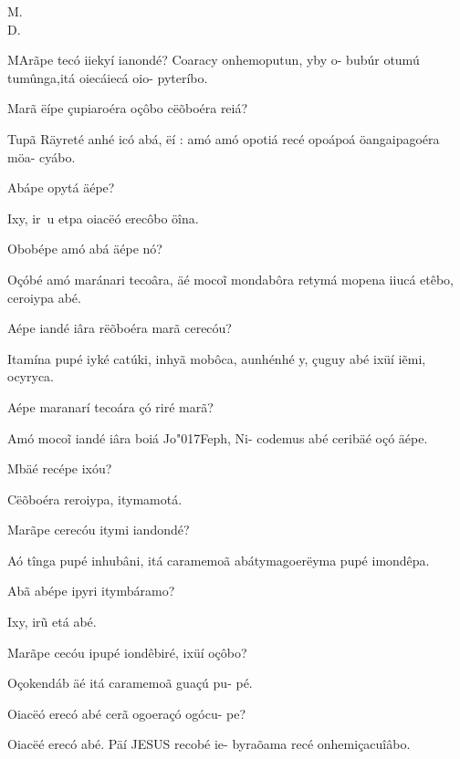\documentclass[openany,titlepage,12pt]{book}
\newcommand{\lgS}{\char"017F}
\newcommand{\comecalista}[5]{
    \hspace*{-11.7pt}
    \begin{minipage}[t]{0.08\linewidth}
        \flushright #1\\#2
    \end{minipage}
    \hspace{0pt}
    \begin{minipage}[t]{0.94\linewidth}
        \lettrine
        [findent =2pt, nindent=0pt,  lines=2]
        {#3}{#4}#5
    \end{minipage}
    \vspace*{-3pt}
}
\begin{document}
\comecalista{M.}{D.}{M}{A}
{rãpe tecó iiekyí ianondé?\linebreak
    Coaracy onhemoputun, yby o-\linebreak
    \hspace*{-1ex}bubúr otumú tumûnga,itá oiecáiecá oio-
    \hspace*{-1ex}pyteríbo.
}
\begin{alternate}
    \item Marã ëípe çupiaroéra oçôbo cëõboéra
        reiá?
    \item Tupã Räyreté anhé icó abá, ëí : amó amó
        opotiá recé opoápoá öangaipagoéra möa-
        cyábo.
    \item Abápe opytá äépe?
    \item Ixy, ir~u etpa oiacëó erecôbo öîna.
    \item Obobépe amó abá äépe nó?
    \item Oçóbé amó maránari tecoâra, äé moco\~i
        mondabôra retymá mopena iiucá etêbo,
        ceroiypa abé.
    \item Aépe iandé iâra rëõboéra marã cerecóu?
    \item Itamína pupé iyké catúki, inhyã mobôca,
        aunhénhé y, çuguy abé ixüí i\~emi, ocyryca.
    \item Aépe maranarí tecoára çó riré marã?
    \item Amó moco\~i iandé iâra boiá Jo\lgS eph, Ni-
        codemus abé ceribäé oçó äépe.
    \item Mbäé recépe ixóu?
    \item Cëõboéra reroiypa, itymamotá.
    \item Marãpe cerecóu itymi iandondé?
    \item Aó tînga pupé inhubâni, itá caramemoã
        abátymagoerëyma pupé imondêpa.
    \item Abã abépe ipyri itymbáramo?
    \item Ixy, ir\~u etá abé.
    \item Marãpe cecóu ipupé iondêbiré, ixüí\linebreak
        oçôbo?
    \item Oçokendáb äé itá caramemoã guaçú pu-
        pé.
    \item Oiacëó erecó abé cerã ogoeraçó ogócu-
        pe?  
    \item Oiacëé erecó abé. Päí JESUS recobé ie-
        byraõama recé onhemiçacuîâbo.

\end{alternate}
\end{document}
